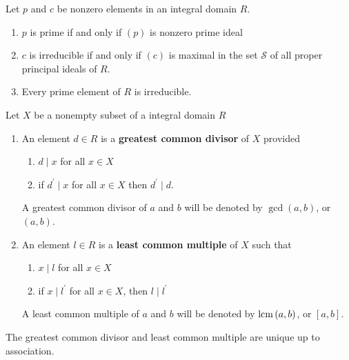 \begin{theorem}
    Let $p$ and $c$ be nonzero elements in an integral domain $R$.
    \begin{enumerate}
        \item $p$ is prime if and only if $(p)$ is nonzero prime ideal

        \item  $c$ is irreducible if and only if
              $(c)$ is maximal in the set $\mathcal{S}$ of all proper principal ideals of $R$.

        \item
              Every prime element of $R$ is irreducible.
    \end{enumerate}
\end{theorem}
\begin{definition}
    Let $X$ be a nonempty subset of a integral domain $R$
    \begin{enumerate}
        \item
              An element $d \in R$ is a \textbf{greatest common divisor} of $X$ provided
              \begin{enumerate}[label=(\roman*)]
                  \item $d \mid x$ for all $x \in X$
                  \item if $d^\prime \mid x$ for all $x \in X$ then $d^{\prime} \mid d$.
              \end{enumerate}
              A greatest common divisor of $a$ and $b$ will be denoted by $\gcd\left(a, b\right)$, or $(a, b)$.
        \item
              An element $l\in R$ is a \textbf{least common multiple} of $X$ such that
              \begin{enumerate}[label=(\roman*)]
                  \item $x\mid l$ for all $x \in X$
                  \item if $x\mid l^\prime$ for all $x \in X$, then $l\mid l^\prime$
              \end{enumerate}
              A least common multiple of $a$ and $b$ will be denoted by $ \operatorname{\operatorname{lcm}} \left(a, b\right)$, or $[a, b]$.
    \end{enumerate}
    \begin{remark}
        The greatest common divisor and least common multiple are unique up to association.
    \end{remark}
\end{definition}

